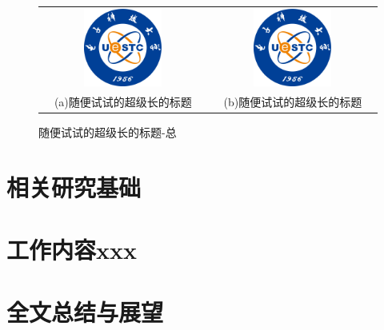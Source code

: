 \documentclass[promaster]{thesis-uestc}
\begin{document}
\begin{figure}[!htb]
    \small
    \centering
    \begin{tabular}{@{\ }c@{\ }c}
        \includegraphics[width=0.49\textwidth]{pic/logo.pdf} & 
        \hspace{5pt}
        \includegraphics[width=0.49\textwidth]{pic/logo.pdf}     \\
        \mbox{\small (a)随便试试的超级长的标题}                                                                               & 
        \mbox{\small (b)随便试试的超级长的标题}                                                                                  \\
    \end{tabular}
    \caption{随便试试的超级长的标题-总}
    \label{fig:test}
\end{figure}


\chapter{相关研究基础}
\chapter{工作内容xxx}
\chapter{全文总结与展望}
\end{document}
